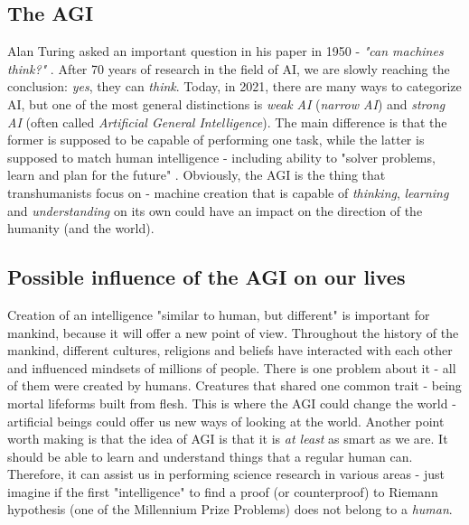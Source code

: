 \documentclass[12pt]{article}
\begin{document}
\subsection{The AGI}
	Alan Turing asked an important question in his paper in 1950 - \emph{"can machines think?"} \cite{turing}. After 70 years of research in the field of AI, we are slowly reaching the conclusion: \emph{yes}, they can \emph{think}. Today, in 2021, there are many ways to categorize AI, but one of the most general distinctions is \emph{weak AI} (\emph{narrow AI}) and \emph{strong AI} (often called \emph{Artificial General Intelligence}). The main difference is that the former is supposed to be capable of performing one task, while the latter is supposed to match human intelligence - including ability to "solver problems, learn and plan for the future" \cite{agi:1}. Obviously, the AGI is the thing that transhumanists focus on - machine creation that is capable of \emph{thinking}, \emph{learning} and \emph{understanding} on its own could have an impact on the direction of the humanity (and the world).

\subsection{Possible influence of the AGI on our lives}
	Creation of an intelligence "similar to human, but different" is important for mankind, because it will offer a new point of view. Throughout the history of the mankind, different cultures, religions and beliefs have interacted with each other and influenced mindsets of millions of people. There is one problem about it - all of them were created by humans. Creatures that shared one common trait - being mortal lifeforms built from flesh. This is where the AGI could change the world - artificial beings could offer us new ways of looking at the world. Another point worth making is that the idea of AGI is that it is \emph{at least} as smart as we are. It should be able to learn and understand things that a regular human can. Therefore, it can assist us in performing science research in various areas - just imagine if the first "intelligence" to find a proof (or counterproof) to Riemann hypothesis (one of the Millennium Prize Problems) does not belong to a \emph{human}.
\end{document}
